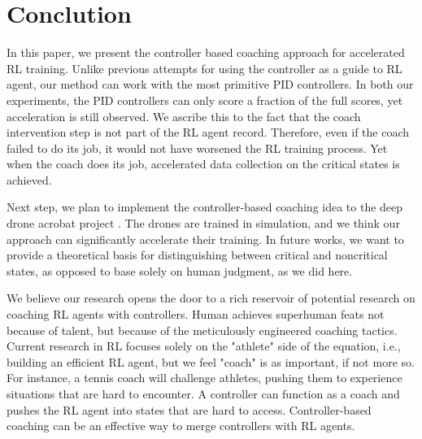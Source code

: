 \documentclass[smallextended]{svjour3}
\begin{document}
\section{Conclution}

In this paper, we present the controller based coaching approach for accelerated RL training. Unlike previous attempts for using the controller as a guide to RL agent, our method can work with the most primitive PID controllers. In both our experiments, the PID controllers can only score a fraction of the full scores, yet acceleration is still observed. We ascribe this to the fact that the coach intervention step is not part of the RL agent record. Therefore, even if the coach failed to do its job, it would not have worsened the RL training process. Yet when the coach does its job, accelerated data collection on the critical states is achieved. 

Next step, we plan to implement the controller-based coaching idea to the deep drone acrobat project \cite{Kaufmann2020DeepDA}. The drones are trained in simulation, and we think our approach can significantly accelerate their training. In future works, we want to provide a theoretical basis for distinguishing between critical and noncritical states, as opposed to base solely on human judgment, as we did here. 

We believe our research opens the door to a rich reservoir of potential research on coaching RL agents with controllers. Human achieves superhuman feats not because of talent, but because of the meticulously engineered coaching tactics. Current research in RL focuses solely on the "athlete" side of the equation, i.e., building an efficient RL agent, but we feel "coach" is as important, if not more so.  For instance, a tennis coach will challenge athletes, pushing them to experience situations that are hard to encounter. A controller can function as a coach and pushes the RL agent into states that are hard to access. Controller-based coaching can be an effective way to merge controllers with RL agents. 





%
%
\end{document}
